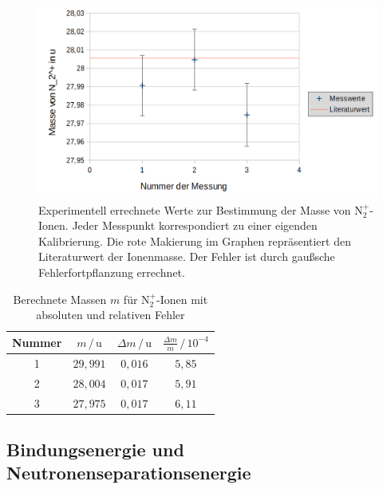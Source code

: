 \documentclass[numbers=noenddot,a4paper,notitlepage,twoside,BCOR15mm]{scrartcl}
\begin{document}
				\begin{figure}[!h]
					\centering
					\includegraphics[width = 0.7\columnwidth]{pics/Masse}
					\caption{Experimentell errechnete Werte zur Bestimmung der Masse von N$_2^+$-Ionen. Jeder Messpunkt korrespondiert zu einer eigenden Kalibrierung. Die rote Makierung im Graphen repräsentiert den Literaturwert der Ionenmasse. Der Fehler ist durch gaußsche Fehlerfortpflanzung errechnet.}
					\label{abb:masse}
				\end{figure}
				
		
						\begin{table}[h]
					\centering
					\caption{Berechnete Massen $m$ für N$^+_2$-Ionen mit absoluten und relativen Fehler}
					\begin{tabular}{c|c c c} 
					
						Nummer & $m\,/\,\mathrm{u}$ & $\Delta m\,/\,\mathrm{u}$ & $\frac{\Delta m}{m}\,/\,10^{-4}$ \\ \hline
						1 & $29,991$ & $0,016$ & $5,85$ \\
						2 & $28,004$ & $0,017$ & $5,91$ \\
						3 & $27,975$ & $0,017$ & $6,11$ 
					\end{tabular}
					\label{tab:masse}
				\end{table}
				\newpage

		\subsection{Bindungsenergie und Neutronenseparationsenergie}
		
\end{document}
